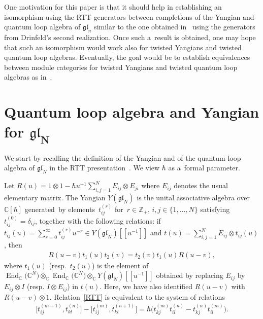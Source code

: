 \documentclass[pdftex]{sigma}
\numberwithin{theorem}{section}
\numberwithin{proposition}{section}
\numberwithin{lemma}{section}
\numberwithin{corollary}{section}
\numberwithin{definition}{section}
\numberwithin{example}{section}
\numberwithin{remark}{section}
\numberwithin{note}{section}
\DeclareMathOperator{\End}{End}
\numberwithin{equation}{section}
\begin{document}
One motivation for this paper is that it should help in establishing an isomorphism using the RTT-generators between
completions of the Yangian and quantum loop algebra of $\mathfrak{gl}_n$ similar to the one obtained
in~\cite{GaTL1} using the generators from Drinfeld's second realization.
Once such a~result is obtained, one may hope that such an isomorphism would work also for twisted Yangians and twisted
quantum loop algebras.
Eventually, the goal would be to establish equiva\-lences between module categories for twisted Yangians and twisted
quantum loop algebras as in~\cite{GaTL2,GaTL3}.

\section[Quantum loop algebra and Yangian for $\mathfrak{gl}_N$]{Quantum loop algebra and Yangian for $\boldsymbol{\mathfrak{gl}_N}$}

We start by recalling the def\/inition of the Yangian and of the quantum loop algebra of $\mathfrak{gl}_N$ in
the RTT presentation~\cite{FRT}.
We view $\hbar$ as a~formal parameter.

\begin{definition}
\label{Ygln}
Let $R(u) = 1 \otimes 1 - \hbar u^{-1} \sum\limits_{i,j=1}^N E_{ij} \otimes E_{ji} $ where $E_{ij}$ denotes the usual
elementary matrix.
The Yangian $Y(\mathfrak{gl}_N)$ is the unital associative algebra over $\mathbb{C}[\hbar]$ generated~by
elements~$t_{ij}^{(r)}$ for~$r\in\mathbb{Z}_+$, $i,j \in \{1,\ldots,N\}$ satisfying $t_{ij}^{(0)}=\delta_{ij}$, together
with the following relations: if $t_{ij}(u)=\sum\limits_{r=0}^\infty {t_{ij}^{(r)}u^{-r}} \in
Y(\mathfrak{gl}_N)[[u^{-1}]]$ and $t(u) =\sum\limits_{i,j=1}^N {E_{ij} \otimes t_{ij}(u)}$, then
\begin{gather}
R(u-v)t_1(u)t_2(v)=t_2(v)t_1(u)R(u-v),
\label{RTT}
\end{gather}
where $t_1(u)$ (resp.\ $t_2(u)$) is the element of $\End_{\mathbb{C}}\big(\mathbb{C}^N\big) \otimes_{\mathbb{C}}
\End_{\mathbb{C}}\big(\mathbb{C}^N\big) \otimes_{\mathbb{C}} Y(\mathfrak{gl}_N)[[u^{-1}]]$ obtained by replacing
$E_{ij}$ by $E_{ij} \otimes I$ (resp.
$I \otimes E_{ij}$) in $t(u)$.
Here, we have also identif\/ied $R(u-v)$ with $R(u-v)\otimes 1$.
Relation~\eqref{RTT} is equivalent to the system of relations
\begin{gather*}
\big[t_{ij}^{(m+1)},t_{kl}^{(n)}\big]-\big[t_{ij}^{(m)},t_{kl}^{(n+1)}\big]
= \hbar\big(t_{kj}^{(m)}t_{il}^{(n)}-t_{kj}^{(n)}t_{il}^{(m)}\big).
\end{gather*}
\end{definition}
\end{document}
